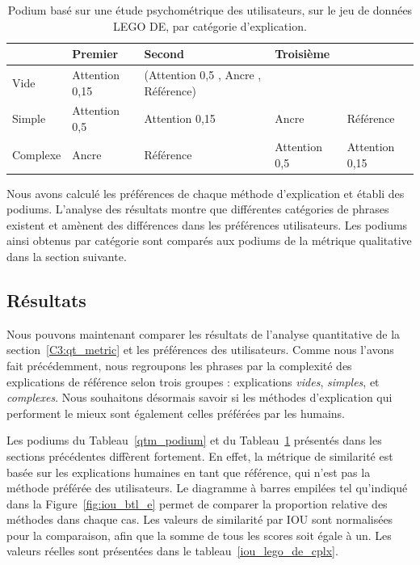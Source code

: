 \begin{table}[h!tpb]
    \centering
    \addtolength{\parskip}{-0.5mm}
  \caption{Podium basé sur une étude psychométrique des utilisateurs, sur le jeu de données LEGO DE, par catégorie d'explication.} \label{pus_podium}
  \begin{tabular}{|l|l|p{}|l|l|}
      \hline
           & \textbf{Premier}& \textbf{Second}   & \textbf{Troisième} \\ \hline
  Vide     &  Attention 0,15 &  (Attention 0,5 ,  Ancre , Référence)  &&   \\ \hline
  Simple   &  Attention 0,5  &  Attention 0,15     & Ancre      &   Référence    \\ \hline
  Complexe &  Ancre          & Référence      &  Attention 0,5      &   Attention 0,15      \\ \hline
  \end{tabular}
  \end{table}

Nous avons calculé les préférences de chaque méthode d'explication et établi des podiums. L'analyse des résultats montre que différentes catégories de phrases existent et amènent des différences dans les préférences utilisateurs. Les podiums ainsi obtenus par catégorie sont comparés aux podiums de la métrique qualitative dans la section suivante.

\subsection{Résultats} \label{C3:pus_result}

Nous pouvons maintenant comparer les résultats de l'analyse quantitative de la section~\ref{C3:qt_metric} et les préférences des utilisateurs.
Comme nous l'avons fait précédemment, nous regroupons les phrases par la complexité des explications de référence selon trois groupes : explications \textit{vides}, \textit{simples}, et \textit{complexes}.
Nous souhaitons désormais savoir si les méthodes d'explication qui performent le mieux sont également celles préférées par les humains.

Les podiums du Tableau~\ref{qtm_podium} et du Tableau~\ref{pus_podium} présentés dans les sections précédentes diffèrent fortement. En effet, la métrique de similarité est basée sur les explications humaines en tant que référence, qui n'est pas la méthode préférée des utilisateurs.
Le diagramme à barres empilées tel qu'indiqué dans la Figure~\ref{fig:iou_btl_e} permet de comparer la proportion relative des méthodes dans chaque cas. Les valeurs de similarité par IOU sont normalisées pour la comparaison, afin que la somme de tous les scores soit égale à un. Les valeurs réelles sont présentées dans le tableau~\ref{iou_lego_de_cplx}.

